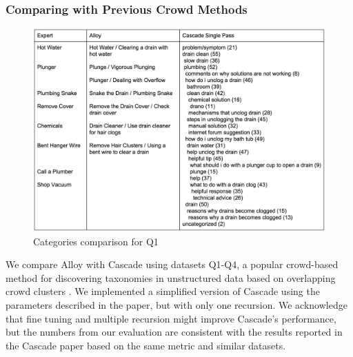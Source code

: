 
\subsubsection*{Comparing with Previous Crowd Methods}


\begin{figure}
	\centering
	\includegraphics[width=0.9\columnwidth]{Chapters/Alloy/images/bathtub_cats.png}
	\caption{Categories comparison for Q1}
	\label{fig:bathtub_cats}
\end{figure}


We compare Alloy with Cascade using datasets Q1-Q4, a popular crowd-based method for
discovering taxonomies in unstructured data based on overlapping crowd
clusters \cite{chilton2013cascade}.
We implemented a simplified version of Cascade using the parameters
described in the paper, but with only one recursion.  We acknowledge that fine
tuning and multiple recursion might improve Cascade's performance, but the
numbers from our evaluation are consistent with the results reported in the
Cascade paper based on the same metric and similar datasets.

